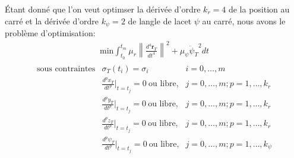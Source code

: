 \documentclass{article}
\newcommand{\norm}[1]{\left\lVert#1\right\rVert}
\begin{document}
Étant donné que l'on veut optimser la dérivée d'ordre $k_r = 4$ de la position au carré et la dérivée d'ordre $k_\psi = 2$ de langle de lacet $\psi$ au carré, nous avons le problème d'optimisation:
\begin{align}\label{eq:opt}
\text{min} \int_{t_0}^{t_m} \mu_r \norm{\frac{d^4 \boldsymbol{r}_T}{dt^4}}^2 + \mu_\psi {\ddot{\psi}_T}^2 dt
\end{align}\begin{align*}
	\begin{array}{lll}
		\text{sous contraintes} & \sigma_T(t_i) = \sigma_i & i = 0, \ldots, m\\
		& \frac{d^p x_T}{dt^p}|_{t=t_j} = 0\ \text{ou libre,} & j = 0, \ldots, m; p = 1, \ldots, k_r\\
		& \frac{d^p y_T}{dt^p}|_{t=t_j} = 0\ \text{ou libre,} & j = 0, \ldots, m; p = 1, \ldots, k_r\\
		& \frac{d^p z_T}{dt^p}|_{t=t_j} = 0\ \text{ou libre,} & j = 0, \ldots, m; p = 1, \ldots, k_r\\
		& \frac{d^p \psi_T}{dt^p}|_{t=t_j} = 0\ \text{ou libre,} & j = 0, \ldots, m; p = 1, \ldots, k_\psi\\
	\end{array}
\end{align*}
\end{document}
